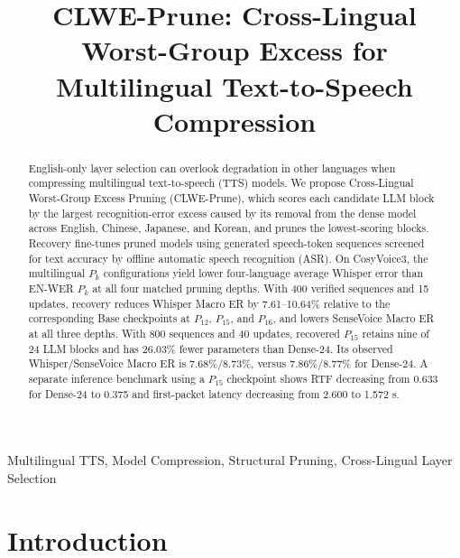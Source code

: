 \documentclass{article}
\title{CLWE-Prune: Cross-Lingual Worst-Group Excess for Multilingual Text-to-Speech Compression}
\begin{document}
\ninept
%
\maketitle

\begingroup
\renewcommand{\thefootnote}{\fnsymbol{footnote}}
\endgroup
%
\begin{abstract}
English-only layer selection can overlook degradation in other
languages when compressing multilingual text-to-speech (TTS) models.
We propose Cross-Lingual Worst-Group Excess Pruning (CLWE-Prune),
which scores each candidate LLM block by the largest recognition-error
excess caused by its removal from the dense model across English,
Chinese, Japanese, and Korean, and prunes the lowest-scoring blocks.
Recovery fine-tunes pruned models using generated speech-token
sequences screened for text accuracy by offline automatic speech
recognition (ASR). On CosyVoice3, the multilingual \(P_k\)
configurations yield lower four-language average Whisper error than
EN-WER \(P_k\) at all four matched pruning depths. With 400 verified
sequences and 15 updates, recovery reduces Whisper Macro ER by
7.61--10.64\% relative to the corresponding Base checkpoints at
\(P_{12}\), \(P_{15}\), and \(P_{16}\), and lowers SenseVoice Macro ER
at all three depths. With 800 sequences and 40 updates, recovered
\(P_{15}\) retains nine of 24 LLM blocks and has 26.03\% fewer
parameters than Dense-24. Its observed Whisper/SenseVoice Macro ER
is 7.68\%/8.73\%, versus 7.86\%/8.77\% for Dense-24. A separate inference benchmark using a \(P_{15}\) checkpoint shows
RTF decreasing from 0.633 for Dense-24 to 0.375 and first-packet
latency decreasing from 2.600 to 1.572 s.
\end{abstract}
%
\begin{keywords}
Multilingual TTS, Model Compression, Structural Pruning, Cross-Lingual Layer Selection
\end{keywords}
%

\section{Introduction}
\label{sec:intro}
\end{document}
